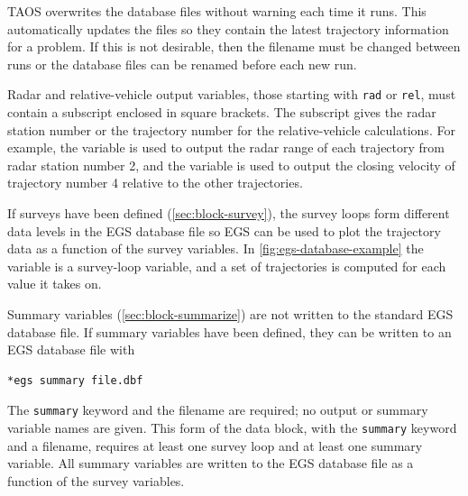 TAOS overwrites the  database files without warning each time
it runs. This automatically updates the files so they contain the latest trajectory
information for a problem. If this is not desirable, then the filename must be changed
between runs or the database files can be renamed before each new run.

Radar and relative-vehicle output variables, those starting with \texttt{rad} or
\texttt{rel}, must contain a subscript enclosed in square brackets. The subscript gives
the radar station number or the trajectory number for the relative-vehicle
calculations. For example, the variable  is used to output the
radar range of each trajectory from radar station number 2, and the variable
 is used to output the closing velocity of trajectory number 4
relative to the other trajectories.

If surveys have been defined (\cref{sec:block-survey}), the survey loops form
different data levels in the EGS database file so EGS can be used to plot the
trajectory data as a function of the survey variables. In
\cref{fig:egs-database-example} the variable  is a survey-loop
variable, and a set of trajectories is computed for each value it takes on.

Summary variables (\cref{sec:block-summarize}) are not written to the standard
EGS database file. If summary variables have been defined, they can be written to
an EGS database file with

\begin{lstlisting}[style=taosmanual]
*egs summary file.dbf
\end{lstlisting}

The \texttt{summary} keyword and the filename are required; no output or summary
variable names are given. This form of the  data block, with the
\texttt{summary} keyword and a filename, requires at least one survey loop and at
least one summary variable. All summary variables are written to the EGS database
file as a function of the survey variables.
